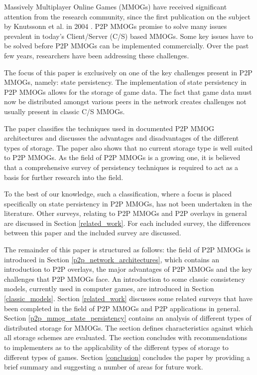 \documentclass[10pt,a4paper,journal,cspaper,compsoc]{IEEEtran}
\begin{document}
%
%
%
%

 Massively Multiplayer Online Games (MMOGs) have received significant attention from the research community, since
the first publication on the subject by Knutssonn et al. in 2004 \cite{knutsson_p2p_first}. P2P MMOGs promise to solve many issues prevalent in
today's Client/Server (C/S) based MMOGs. Some key issues have to be solved before P2P MMOGs can be implemented commercially. Over the past few years,
researchers have been addressing these challenges.

The focus of this paper is exclusively on one of the key challenges present in P2P MMOGs, namely: state persistency. The implementation of state
persistency in P2P MMOGs allows for the storage of game data. The fact that game data must now be distributed amongst various peers in the network
creates challenges not usually present in classic C/S MMOGs.

The paper classifies the techniques used in documented P2P MMOG architectures and discusses the advantages and disadvantages of the different types
of storage. The paper also shows that no current storage type is well suited to P2P MMOGs. As the field of P2P MMOGs is a growing one, it is believed
that a comprehensive survey of persistency techniques is required to act as a basis for further research into the field.

To the best of our knowledge, such a classification, where a focus is placed specifically on state persistency in P2P MMOGs, has not been undertaken
in the literature. Other surveys, relating to P2P MMOGs and P2P overlays in general are discussed in Section \ref{related_work}. For each included
survey, the differences between this paper and the included survey are discussed.

The remainder of this paper is structured as follows: the field of P2P MMOGs is introduced in Section \ref{p2p_network_architectures}, which contains
an introduction to P2P overlays, the major advantages of P2P MMOGs and the key challenges that P2P MMOGs face. An introduction to some classic
consistency models, currently used in computer games, are introduced in Section \ref{classic_models}. Section \ref{related_work} discusses some
related surveys that have been completed in the field of P2P MMOGs and P2P applications in general. Section \ref{p2p_mmog_state_persistency} contains
an analysis of different types of distributed storage for MMOGs. The section defines characteristics against which all storage schemes are evaluated.
The section concludes with recommendations to implementers as to the applicability of the different types of storage to different types of games.
Section \ref{conclusion} concludes the paper by providing a brief summary and suggesting a number of areas for future work.
\end{document}
